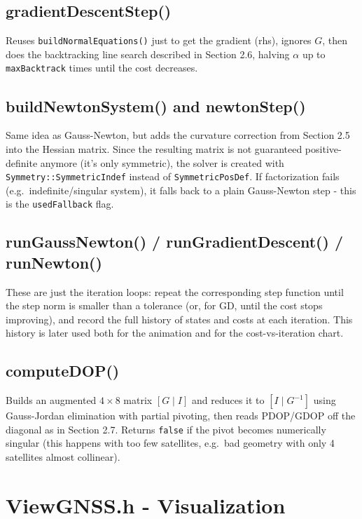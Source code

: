 \documentclass[11pt]{article}
\begin{document}
\subsection{gradientDescentStep()}

Reuses \texttt{buildNormalEquations()} just to get the gradient (rhs), ignores $G$, then does the backtracking line search described in Section 2.6, halving $\alpha$ up to \texttt{maxBacktrack} times until the cost decreases.

\subsection{buildNewtonSystem() and newtonStep()}

Same idea as Gauss-Newton, but adds the curvature correction from Section 2.5 into the Hessian matrix. Since the resulting matrix is not guaranteed positive-definite anymore (it's only symmetric), the solver is created with \texttt{Symmetry::SymmetricIndef} instead of \texttt{SymmetricPosDef}. If factorization fails (e.g.\ indefinite/singular system), it falls back to a plain Gauss-Newton step - this is the \texttt{usedFallback} flag.

\subsection{runGaussNewton() / runGradientDescent() / runNewton()}

These are just the iteration loops: repeat the corresponding step function until the step norm is smaller than a tolerance (or, for GD, until the cost stops improving), and record the full history of states and costs at each iteration. This history is later used both for the animation and for the cost-vs-iteration chart.

\subsection{computeDOP()}

Builds an augmented $4\times8$ matrix $[G \mid I]$ and reduces it to $[I \mid G^{-1}]$ using Gauss-Jordan elimination with partial pivoting, then reads PDOP/GDOP off the diagonal as in Section 2.7. Returns \texttt{false} if the pivot becomes numerically singular (this happens with too few satellites, e.g.\ bad geometry with only 4 satellites almost collinear).

\section{ViewGNSS.h - Visualization}
\end{document}
